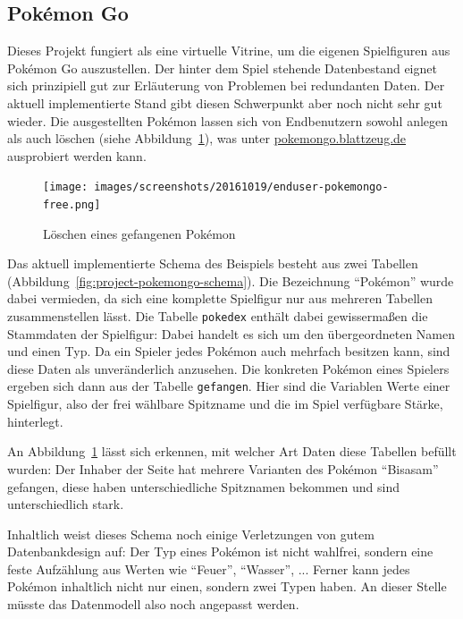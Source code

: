 \subsection{Pokémon Go}

Dieses Projekt fungiert als eine virtuelle Vitrine, um die eigenen Spielfiguren aus Pokémon Go auszustellen. Der hinter dem Spiel stehende Datenbestand eignet sich prinzipiell gut zur Erläuterung von Problemen bei redundanten Daten. Der aktuell implementierte Stand gibt diesen Schwerpunkt aber noch nicht sehr gut wieder. Die ausgestellten Pokémon lassen sich von Endbenutzern sowohl anlegen als auch löschen (siehe Abbildung~\ref{fig:enduser-pokemongo-delete}), was unter \href{http://pokemongo.blattzeug.de/}{\mbox{pokemongo.blattzeug.de}} ausprobiert werden kann.

\begin{figure}[t]
  \centering \texttt{[image: images/screenshots/20161019/enduser-pokemongo-free.png]}
  \caption{Löschen eines gefangenen Pokémon}
  \label{fig:enduser-pokemongo-delete}
\end{figure}

Das aktuell implementierte Schema des Beispiels besteht aus zwei Tabellen (Abbildung~\ref{fig:project-pokemongo-schema}). Die Bezeichnung "`Pokémon"' wurde dabei vermieden, da sich eine komplette Spielfigur nur aus mehreren Tabellen zusammenstellen lässt. Die Tabelle \texttt{pokedex} enthält dabei gewissermaßen die Stammdaten der Spielfigur: Dabei handelt es sich um den übergeordneten Namen und einen Typ. Da ein Spieler jedes Pokémon auch mehrfach besitzen kann, sind diese Daten als unveränderlich anzusehen. Die konkreten Pokémon eines Spielers ergeben sich dann aus der Tabelle \texttt{gefangen}. Hier sind die Variablen Werte einer Spielfigur, also der frei wählbare Spitzname und die im Spiel verfügbare Stärke, hinterlegt.

An Abbildung~\ref{fig:enduser-pokemongo-delete} lässt sich erkennen, mit welcher Art Daten diese Tabellen befüllt wurden: Der Inhaber der Seite hat mehrere Varianten des Pokémon "`Bisasam"' gefangen, diese haben unterschiedliche Spitznamen bekommen und sind unterschiedlich stark.

Inhaltlich weist dieses Schema noch einige Verletzungen von gutem Datenbankdesign auf: Der Typ eines Pokémon ist nicht wahlfrei, sondern eine feste Aufzählung aus Werten wie "`Feuer"', "`Wasser"', ... Ferner kann jedes Pokémon inhaltlich nicht nur einen, sondern zwei Typen haben. An dieser Stelle müsste das Datenmodell also noch angepasst werden.

